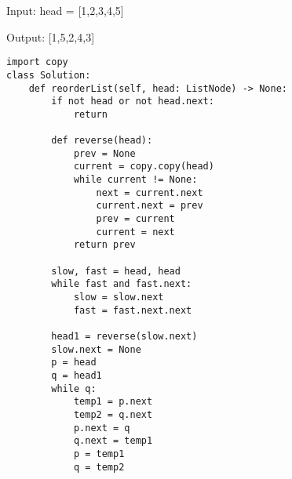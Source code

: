 \documentclass[24pt, a4]{article}
\begin{document}
Input: head = [1,2,3,4,5]

Output: [1,5,2,4,3]
\begin{lstlisting}
import copy
class Solution:
    def reorderList(self, head: ListNode) -> None:
        if not head or not head.next:
            return 
        
        def reverse(head):
            prev = None
            current = copy.copy(head)
            while current != None:
                next = current.next
                current.next = prev
                prev = current
                current = next
            return prev
        
        slow, fast = head, head
        while fast and fast.next:
            slow = slow.next
            fast = fast.next.next
            
        head1 = reverse(slow.next)
        slow.next = None
        p = head
        q = head1
        while q:
            temp1 = p.next
            temp2 = q.next
            p.next = q
            q.next = temp1
            p = temp1
            q = temp2
\end{lstlisting}
\end{document}
